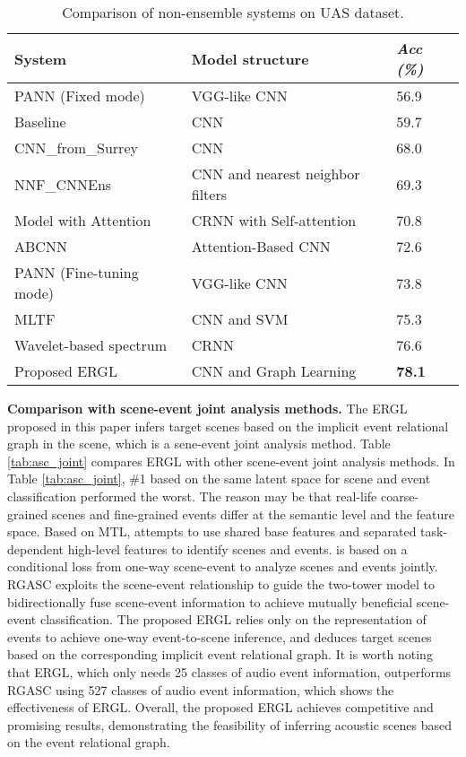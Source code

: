\documentclass{article}
\begin{document}
 
\begin{table}[t] \footnotesize 
\setlength{\abovecaptionskip}{0cm}   \setlength{\belowcaptionskip}{0cm}
	\renewcommand\tabcolsep{1pt} 
	\centering
	\caption{Comparison of non-ensemble systems on UAS dataset.}
	\begin{tabular}{
	p{3.2cm}<{\centering}|
	p{3.9cm}<{\centering}|
	p{1.0cm}<{\centering}
	} 
	    \hline 
		System & Model structure & \textsl{Acc (\%)}\\ 
		\hline
		PANN \cite{kong2020panns} (Fixed mode) & VGG-like CNN & 56.9 \\ 	
		Baseline \cite{DCASE2018} & CNN & 59.7 \\ 
		
		CNN\_from\_Surrey \cite{Kong2018} & CNN &  68.0 \\ 
		NNF\_CNNEns \cite{Nguyen2018a} & CNN and nearest neighbor filters & 69.3 \\  
		Model with Attention \cite{wang2018self} & CRNN with Self-attention & 70.8 \\ 
  ABCNN \cite{Ren2018} & Attention-Based CNN & 72.6 \\ 
		PANN (Fine-tuning mode) & VGG-like CNN & 73.8 \\ 
		MLTF \cite{Zhang2018-svm} & CNN and SVM & 75.3 \\
  Wavelet-based  spectrum \cite{li_icmew} & CRNN & 76.6 \\
  Proposed ERGL & CNN and Graph Learning & \textbf{78.1} \\ 
	\hline
	\end{tabular}
	\label{tab:asc_model}
\end{table}


\textbf{Comparison with scene-event joint analysis methods.}
The ERGL proposed in this paper infers target scenes based on the implicit event relational graph in the scene, which is a sene-event joint analysis method. Table \ref{tab:asc_joint} compares ERGL with  other scene-event joint analysis methods.
In Table \ref{tab:asc_joint}, \#1 based on the same latent space for scene and event classification performed the worst. The reason may be that real-life coarse-grained scenes and fine-grained events differ at the semantic level and the feature space.
Based on MTL, \cite{tonami2021joint} attempts to use shared base features and separated task-dependent high-level features to identify scenes and events.
\cite{komatsu2020scene} is based on a conditional loss from one-way scene-event to analyze scenes and events jointly.
RGASC \cite{RGASC} exploits the scene-event relationship to guide the two-tower model to bidirectionally fuse scene-event information to achieve mutually beneficial scene-event classification.
The proposed ERGL relies only on the representation of events to achieve one-way event-to-scene inference, and deduces target scenes based on the corresponding implicit event relational graph.
It is worth noting that ERGL, which only needs 25 classes of audio event information, outperforms RGASC using 527 classes of audio event information, which shows the effectiveness of ERGL.
Overall, 
the proposed ERGL achieves competitive and promising results, demonstrating the feasibility of inferring acoustic scenes based on the event relational graph. 
\end{document}
